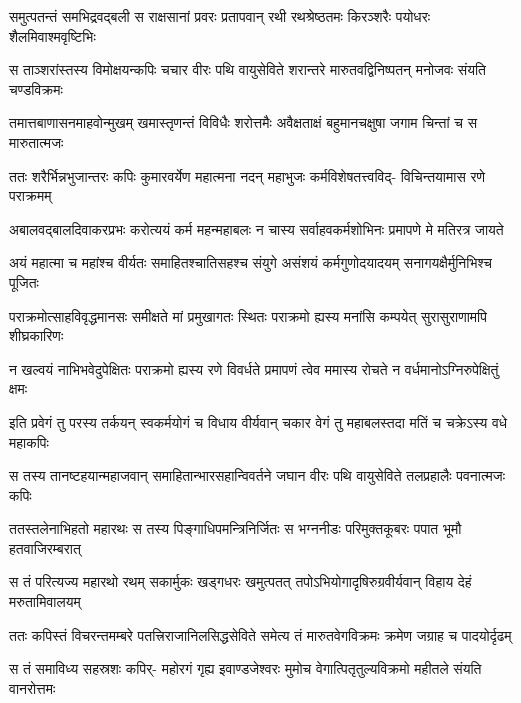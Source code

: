 \fourlineindentedshloka
{समुत्पतन्तं समभिद्रवद्बली}
{स राक्षसानां प्रवरः प्रतापवान्}
{रथी रथश्रेष्ठतमः किरञ्शरैः}
{पयोधरः शैलमिवाश्मवृष्टिभिः} %

\fourlineindentedshloka
{स ताञ्शरांस्तस्य विमोक्षयन्कपिः}
{चचार वीरः पथि वायुसेविते}
{शरान्तरे मारुतवद्विनिष्पतन्}
{मनोजवः संयति चण्डविक्रमः} %

\fourlineindentedshloka
{तमात्तबाणासनमाहवोन्मुखम्}
{खमास्तृणन्तं विविधैः शरोत्तमैः}
{अवैक्षताक्षं बहुमानचक्षुषा}
{जगाम चिन्तां च स मारुतात्मजः} %

\fourlineindentedshloka
{ततः शरैर्भिन्नभुजान्तरः कपिः}
{कुमारवर्येण महात्मना नदन्}
{महाभुजः कर्मविशेषतत्त्वविद्-}
{विचिन्तयामास रणे पराक्रमम्} %

\fourlineindentedshloka
{अबालवद्बालदिवाकरप्रभः}
{करोत्ययं कर्म महन्महाबलः}
{न चास्य सर्वाहवकर्मशोभिनः}
{प्रमापणे मे मतिरत्र जायते} %

\fourlineindentedshloka
{अयं महात्मा च महांश्च वीर्यतः}
{समाहितश्चातिसहश्च संयुगे}
{असंशयं कर्मगुणोदयादयम्}
{सनागयक्षैर्मुनिभिश्च पूजितः} %

\fourlineindentedshloka
{पराक्रमोत्साहविवृद्धमानसः}
{समीक्षते मां प्रमुखागतः स्थितः}
{पराक्रमो ह्यस्य मनांसि कम्पयेत्}
{सुरासुराणामपि शीघ्रकारिणः} %

\fourlineindentedshloka
{न खल्वयं नाभिभवेदुपेक्षितः}
{पराक्रमो ह्यस्य रणे विवर्धते}
{प्रमापणं त्वेव ममास्य रोचते}
{न वर्धमानोऽग्निरुपेक्षितुं क्षमः} %

\fourlineindentedshloka
{इति प्रवेगं तु परस्य तर्कयन्}
{स्वकर्मयोगं च विधाय वीर्यवान्}
{चकार वेगं तु महाबलस्तदा}
{मतिं च चक्रेऽस्य वधे महाकपिः} %

\fourlineindentedshloka
{स तस्य तानष्टहयान्महाजवान्}
{समाहितान्भारसहान्विवर्तने}
{जघान वीरः पथि वायुसेविते}
{तलप्रहालैः पवनात्मजः कपिः} %

\fourlineindentedshloka
{ततस्तलेनाभिहतो महारथः}
{स तस्य पिङ्गाधिपमन्त्रिनिर्जितः}
{स भग्ननीडः परिमुक्तकूबरः}
{पपात भूमौ हतवाजिरम्बरात्} %

\fourlineindentedshloka
{स तं परित्यज्य महारथो रथम्}
{सकार्मुकः खड्गधरः खमुत्पतत्}
{तपोऽभियोगादृषिरुग्रवीर्यवान्}
{विहाय देहं मरुतामिवालयम्} %

\fourlineindentedshloka
{ततः कपिस्तं विचरन्तमम्बरे}
{पतत्त्रिराजानिलसिद्धसेविते}
{समेत्य तं मारुतवेगविक्रमः}
{क्रमेण जग्राह च पादयोर्दृढम्} %

\fourlineindentedshloka
{स तं समाविध्य सहस्रशः कपिर्-}
{महोरगं गृह्य इवाण्डजेश्वरः}
{मुमोच वेगात्पितृतुल्यविक्रमो}
{महीतले संयति वानरोत्तमः} %

